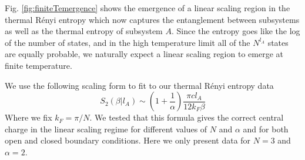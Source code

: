 \documentclass[aps,prb,reprint,floatfix]{revtex4-1}
\begin{document}
Fig. \ref{fig:finiteTemergence} shows the emergence of a linear scaling region in the thermal R\'{e}nyi entropy which now captures the entanglement between subsystems as well as the thermal entropy of subsystem $A$.  Since the entropy goes like the log of the number of states, and in the high temperature limit all of the $N^{l_{A}}$ states are equally probable, we naturally expect a linear scaling region to emerge at finite temperature. 

We use the following scaling form to fit to our thermal R\'{e}nyi entropy data\cite{Calabrese2004:EEandQFT,Korepin2004:thermal}
{\allowdisplaybreaks
\begin{equation}
		S_{2}(\beta |l_{A}) \sim \left (1+\frac{1}{\alpha}  \right ) \frac{\pi c  l_{A}}{12 k_{F} \beta }
\label{eq:Sthermal}
\end{equation}}
Where we fix $k_{F}=\pi/N$.  We tested that this formula gives the correct central charge in the linear scaling regime for different values of $N$ and $\alpha$ and for both open and closed boundary conditions.  Here we only present data for $N=3$ and $\alpha=2$.
\end{document}
